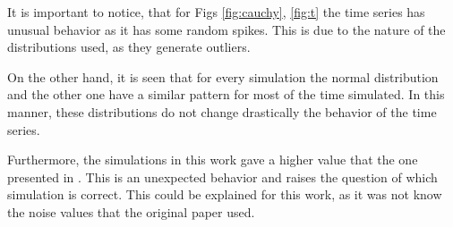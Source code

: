 It is important to notice, that for Figs \ref{fig:cauchy}, \ref{fig:t}
the time series has unusual behavior as it has some random
spikes. This is due to the nature of the distributions used, as they
generate outliers.

On the other hand, it is seen that for every
simulation the normal distribution and the other one have a similar
pattern for most of the time simulated. In this manner, these
distributions do not change drastically the behavior of the time
series.

Furthermore, the simulations in this work gave a higher value that the
one presented in \cite{li2014armax}. This is an unexpected behavior
and raises the question of which simulation is correct. This could be
explained for this work, as it was not know the noise values that the
original paper used.
